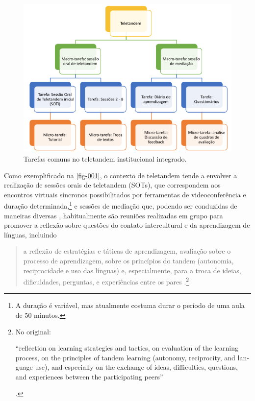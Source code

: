 \documentclass[portuguese]{textolivre}
\begin{document}
\begin{figure}[htbp]
  \centering
  \begin{minipage}{.75\textwidth}
    \includegraphics[width=\linewidth]{fig-001.png}
    \caption{Tarefas comuns no teletandem institucional integrado.}
    \label{fig-001}
  \end{minipage}
\end{figure}

Como exemplificado na \autoref{fig-001}, o contexto de teletandem tende a envolver a realização de sessões orais de teletandem (SOTs), que correspondem aos encontros virtuais síncronos possibilitados por ferramentas de videoconferência e duração determinada,\footnote{A duração é variável, mas atualmente costuma durar o período de uma aula de 50 minutos.} e sessões de mediação que, podendo ser conduzidas de maneiras diversas \cite{campos2021}, habitualmente são reuniões realizadas em grupo para promover a reflexão sobre questões do contato intercultural e da aprendizagem de línguas, incluindo 

\begin{quote}
a reflexão de estratégias e táticas de aprendizagem, avaliação sobre o processo de aprendizagem, sobre os princípios do tandem (autonomia, reciprocidade e uso das línguas) e, especialmente, para a troca de ideias, dificuldades, perguntas, e experiências entre os pares \cite[p. 85, tradução própria]{elstermann2022}.\footnote{No original: \begin{english}“reflection on learning strategies and tactics, on evaluation of the learning process, on the principles of tandem learning (autonomy, reciprocity, and language use), and especially on the exchange of ideas, difficulties, questions, and experiences between the participating peers”\end{english} \cite[p. 85]{elstermann2022}.}
\end{quote}
\end{document}
